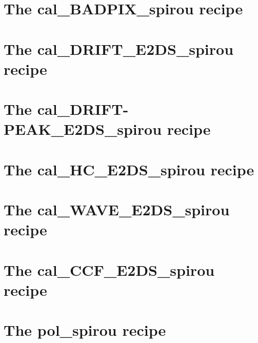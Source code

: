 \section{The cal\_BADPIX\_spirou recipe}
\label{ch:the_recipes:cal_BADPIX_spirou}


\section{The cal\_DRIFT\_E2DS\_spirou recipe}
\label{ch:the_recipes:cal_DRIFT_E2DS_spirou}


\section{The cal\_DRIFT-PEAK\_E2DS\_spirou recipe}
\label{ch:the_recipes:cal_DRIFTPEAK_E2DS_spirou}



\section{The cal\_HC\_E2DS\_spirou recipe}
\label{ch:the_recipes:cal_HC_E2DS_spirou}



\section{The cal\_WAVE\_E2DS\_spirou recipe}
\label{ch:the_recipes:cal_WAVE_E2DS_spirou}



\section{The cal\_CCF\_E2DS\_spirou recipe}
\label{ch:the_recipes:cal_CCF_E2DS_spirou}


\section{The pol\_spirou recipe}
\label{ch:the_recipes:pol_spirou}
